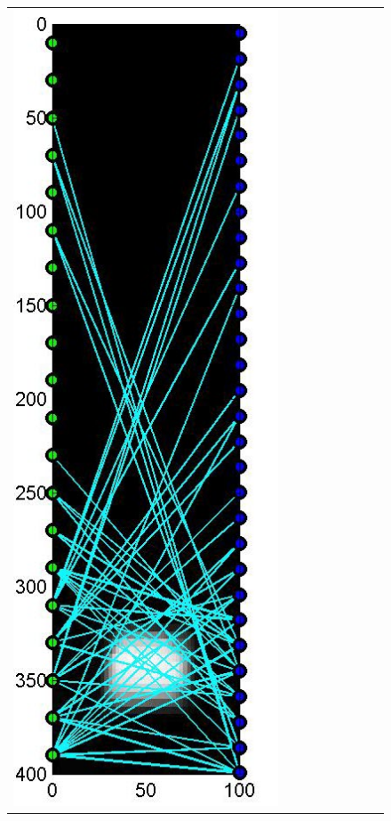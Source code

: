 \documentclass[11pt]{article}
\begin{document}
\begin{figure}[!h]
\begin{center}
\begin{tabular}{|c|c|c|c|c|c|c|c|c|}
			\includegraphics[width=.9\iwidth]{figures/newFigs/noisy/resultsExp-8-designs}
			&

\end{tabular}
\end{center}
\end{figure}
\end{document}
